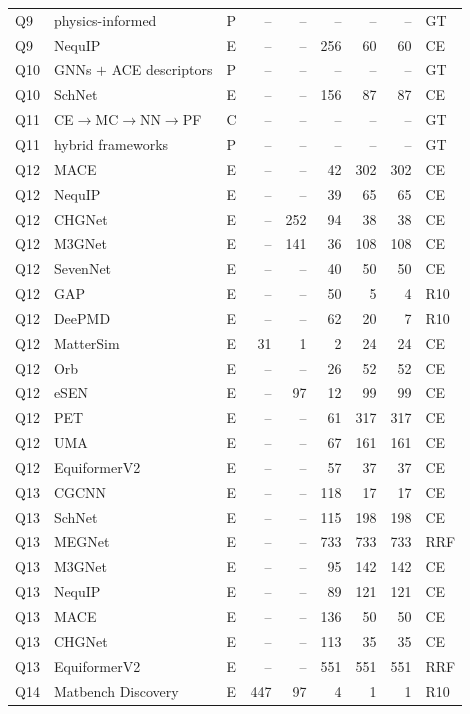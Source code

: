 \documentclass[11pt,a4paper]{article}
\begin{document}
\begin{longtable}{p{0.7cm}p{3.9cm}p{0.5cm}rrrrrp{0.85cm}}
Q9 & physics-informed & P & -- & -- & -- & -- & -- & GT \\
Q9 & NequIP & E & -- & -- & 256 & 60 & 60 & CE \\
Q10 & GNNs $+$ ACE descriptors & P & -- & -- & -- & -- & -- & GT \\
Q10 & SchNet & E & -- & -- & 156 & 87 & 87 & CE \\
Q11 & CE$\rightarrow$MC$\rightarrow$NN$\rightarrow$PF & C & -- & -- & -- & -- & -- & GT \\
Q11 & hybrid frameworks & P & -- & -- & -- & -- & -- & GT \\
Q12 & MACE & E & -- & -- & 42 & 302 & 302 & CE \\
Q12 & NequIP & E & -- & -- & 39 & 65 & 65 & CE \\
Q12 & CHGNet & E & -- & 252 & 94 & 38 & 38 & CE \\
Q12 & M3GNet & E & -- & 141 & 36 & 108 & 108 & CE \\
Q12 & SevenNet & E & -- & -- & 40 & 50 & 50 & CE \\
Q12 & GAP & E & -- & -- & 50 & 5 & 4 & R10 \\
Q12 & DeePMD & E & -- & -- & 62 & 20 & 7 & R10 \\
Q12 & MatterSim & E & 31 & 1 & 2 & 24 & 24 & CE \\
Q12 & Orb & E & -- & -- & 26 & 52 & 52 & CE \\
Q12 & eSEN & E & -- & 97 & 12 & 99 & 99 & CE \\
Q12 & PET & E & -- & -- & 61 & 317 & 317 & CE \\
Q12 & UMA & E & -- & -- & 67 & 161 & 161 & CE \\
Q12 & EquiformerV2 & E & -- & -- & 57 & 37 & 37 & CE \\
Q13 & CGCNN & E & -- & -- & 118 & 17 & 17 & CE \\
Q13 & SchNet & E & -- & -- & 115 & 198 & 198 & CE \\
Q13 & MEGNet & E & -- & -- & 733 & 733 & 733 & RRF \\
Q13 & M3GNet & E & -- & -- & 95 & 142 & 142 & CE \\
Q13 & NequIP & E & -- & -- & 89 & 121 & 121 & CE \\
Q13 & MACE & E & -- & -- & 136 & 50 & 50 & CE \\
Q13 & CHGNet & E & -- & -- & 113 & 35 & 35 & CE \\
Q13 & EquiformerV2 & E & -- & -- & 551 & 551 & 551 & RRF \\
Q14 & Matbench Discovery & E & 447 & 97 & 4 & 1 & 1 & R10 \\

\end{longtable}
\end{document}
